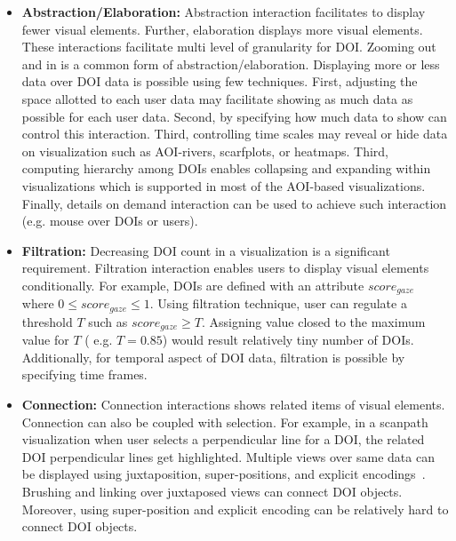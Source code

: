 \begin{itemize}
		\item \textbf{Abstraction/Elaboration:} Abstraction interaction facilitates to display fewer visual elements. Further, elaboration displays more visual elements. These interactions facilitate multi level of granularity for DOI. Zooming out and in is a common form of abstraction/elaboration. Displaying more or less data over DOI data is possible using few techniques. First, adjusting the space allotted to each user data may facilitate showing as much data as possible for each user data. Second, by specifying how much data to show can control this interaction. Third, controlling time scales may reveal or hide data on visualization such as AOI-rivers, scarfplots, or  heatmaps. Third, computing hierarchy among DOIs enables collapsing and expanding within visualizations which is supported in most of the AOI-based visualizations. Finally, details on demand interaction can be used to achieve such interaction (e.g. mouse over DOIs or users).
	
	
	\item \textbf{Filtration:} Decreasing DOI count in a visualization is a significant requirement. Filtration interaction enables users to display visual elements conditionally. For example, DOIs are defined with an attribute $score_{gaze}$ where $0 \leq score_{gaze} \leq 1$. Using filtration technique, user can regulate a threshold $T$ such as $score_{gaze} \geq T$. Assigning  value closed to the maximum value for $T$ ( e.g. $T =0.85$) would result relatively tiny number of DOIs. Additionally, for temporal aspect of DOI data, filtration is possible by specifying time frames. 	

	
	\item \textbf{Connection:} Connection interactions shows related items of visual elements. Connection can also be coupled with selection. For example, in a scanpath visualization when user selects a perpendicular line for a DOI, the related DOI perpendicular lines get highlighted. Multiple views over same data can be displayed using juxtaposition, super-positions, and explicit encodings~\cite{gleicher2011visual}. Brushing and linking over juxtaposed views can connect DOI objects. Moreover, using super-position and explicit encoding can be relatively hard to connect DOI objects. 
\end{itemize}




